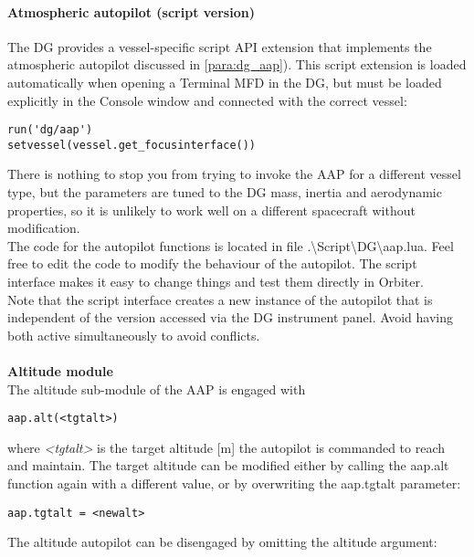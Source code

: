 \documentclass[Orbiter User Manual.tex]{subfiles}
\begin{document}
\paragraph{Atmospheric autopilot (script version)}
The DG provides a vessel-specific script API extension that implements the atmospheric autopilot discussed in \ref{para:dg_aap}). This script extension is loaded automatically when opening a Terminal MFD in the DG, but must be loaded explicitly in the Console window and connected with the correct vessel:

\begin{lstlisting}[language=OSFS]
run('dg/aap')
setvessel(vessel.get_focusinterface())
\end{lstlisting}

\noindent
There is nothing to stop you from trying to invoke the AAP for a different vessel type, but the parameters are tuned to the DG mass, inertia and aerodynamic properties, so it is unlikely to work well on a different spacecraft without modification.\\
The code for the autopilot functions is located in file .\textbackslash Script\textbackslash DG\textbackslash aap.lua. Feel free to edit the code to modify the behaviour of the autopilot. The script interface makes it easy to change things and test them directly in Orbiter.\\
Note that the script interface creates a new instance of the autopilot that is independent of the version accessed via the DG instrument panel. Avoid having both active simultaneously to avoid conflicts.\\
\\
\textbf{Altitude module}\\
The altitude sub-module of the AAP is engaged with

\begin{lstlisting}[language=OSFS]
aap.alt(<tgtalt>)
\end{lstlisting}

\noindent
where \textit{<tgtalt>} is the target altitude [m] the autopilot is commanded to reach and maintain. The target altitude can be modified either by calling the aap.alt function again with a different value, or by overwriting the aap.tgtalt parameter:

\begin{lstlisting}[language=OSFS]
aap.tgtalt = <newalt>
\end{lstlisting}

\noindent
The altitude autopilot can be disengaged by omitting the altitude argument:
\end{document}
